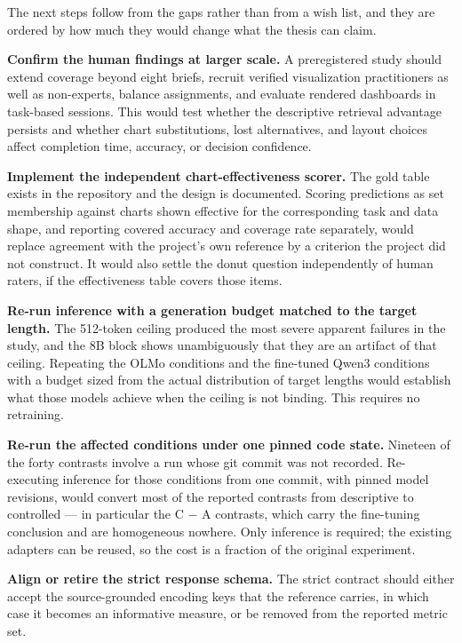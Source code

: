 The next steps follow from the gaps rather than from a wish list, and they are ordered by how much they would change what the thesis can claim.

\textbf{Confirm the human findings at larger scale.} A preregistered study should extend coverage beyond eight briefs, recruit verified visualization practitioners as well as non-experts, balance assignments, and evaluate rendered dashboards in task-based sessions. This would test whether the descriptive retrieval advantage persists and whether chart substitutions, lost alternatives, and layout choices affect completion time, accuracy, or decision confidence.

\textbf{Implement the independent chart-effectiveness scorer.} The gold table exists in the repository and the design is documented. Scoring predictions as set membership against charts shown effective for the corresponding task and data shape, and reporting covered accuracy and coverage rate separately, would replace agreement with the project's own reference by a criterion the project did not construct. It would also settle the donut question independently of human raters, if the effectiveness table covers those items.

\textbf{Re-run inference with a generation budget matched to the target length.} The 512-token ceiling produced the most severe apparent failures in the study, and the 8B block shows unambiguously that they are an artifact of that ceiling. Repeating the OLMo conditions and the fine-tuned Qwen3 conditions with a budget sized from the actual distribution of target lengths would establish what those models achieve when the ceiling is not binding. This requires no retraining.

\textbf{Re-run the affected conditions under one pinned code state.} Nineteen of the forty contrasts involve a run whose git commit was not recorded. Re-executing inference for those conditions from one commit, with pinned model revisions, would convert most of the reported contrasts from descriptive to controlled --- in particular the C \ensuremath{-} A contrasts, which carry the fine-tuning conclusion and are homogeneous nowhere. Only inference is required; the existing adapters can be reused, so the cost is a fraction of the original experiment.

\textbf{Align or retire the strict response schema.} The strict contract should either accept the source-grounded encoding keys that the reference carries, in which case it becomes an informative measure, or be removed from the reported metric set.

